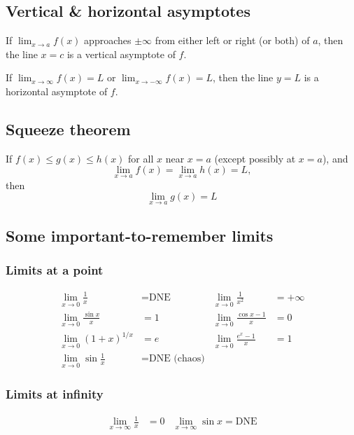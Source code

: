 \documentclass[main.tex]{subfiles}
\begin{document}
\begin{multicols}{2}
	\subsection*{Vertical \& horizontal asymptotes}
	\begin{definition}
		If \(\lim_{x \to a}{f(x)}\) approaches \(\pm \infty\) from either left or right (or both) of \(a\), then the line \(x = c\) is a vertical asymptote of \(f\).
	\end{definition}
	\begin{definition}
		If \(\lim_{x \to \infty}{f(x)} = L\) or \(\lim_{x \to -\infty}{f(x)} = L\), then the line \(y = L\) is a horizontal asymptote of \(f\).
	\end{definition}


	\subsection*{Squeeze theorem}
	\begin{theorem}
	If \(f(x) \leq g(x) \leq h(x)\) for all \(x\) near \(x = a\) (except possibly at \(x = a\)), and
	\[\lim_{x \to a}{f(x)} = \lim_{x \to a}{h(x)} = L,\] then \[\lim_{x \to a}{g(x)} = L\]
	\end{theorem}

	\subsection*{Some important-to-remember limits}
	\subsubsection*{Limits at a point}
	\begin{align*}  %
		\lim_{x \to 0} \frac{1}{x} &= \text{DNE} & \lim_{x \to 0} \frac{1}{x^2} &= +\infty \\
		\lim_{x \to 0} \frac{\sin{x}}{x} &= 1 & \lim_{x \to 0} \frac{\cos{x} - 1}{x} &= 0 \\
		\lim_{x \to 0} (1 + x)^{1/x} &= e & \lim_{x \to 0} \frac{e^x - 1}{x} &= 1 \\
		\lim_{x \to 0} \sin{\frac{1}{x}} &= \text{DNE (chaos)}
	\end{align*}
	\subsubsection*{Limits at infinity}
	\begin{align*}
		\lim_{x \to \infty} \frac{1}{x} &= 0 & \lim_{x \to \infty} \sin{x} = \text{DNE}
	\end{align*}
\end{multicols}
\end{document}
